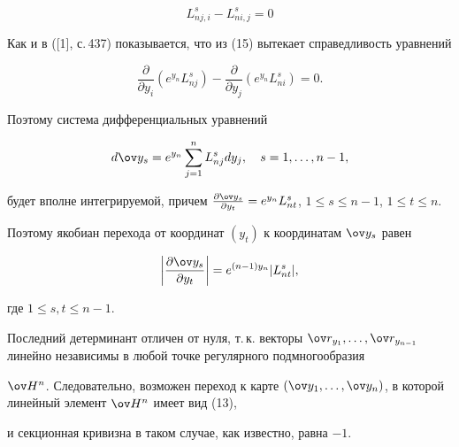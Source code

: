 \begin{note}
\begin{equation}


L^s_{nj,i}-L^s_{ni,j}=0


\end{equation}





Как и в ([1], с.\,437) показывается, что из (15) вытекает справедливость уравнений 


$$


\frac{\partial }{\partial y_i} (e^{y_n}L^s_{nj})


- \frac{\partial }{\partial y_j}( e^{y_n}L^s_{ni}) =0.


$$


Поэтому система дифференциальных уравнений 


$$


d \ov y_s=e^{y_n} \sum_{j=1}^nL^s_{nj }dy_j,\quad s=1,\dotsc,n-1,


$$


будет вполне интегрируемой, причем $\frac{\partial \ov y_s}{\partial y_t}


=e^{y_n}L^s_{nt}$, $1 \leq s \leq n-1$, $1\leq t \leq n$.


Поэтому якобиан перехода от координат $(y_t)$ к координатам $\ov y_s$ равен 


$$


\bigg| \frac{\partial \ov y_s}{\partial y_t} \bigg|=


e^{(n-1)y_n} |L^s_{nt}|,


$$


где $1 \leq s,t \leq n-1$.





Последний детерминант отличен от нуля, т.\,к. векторы $\ov r_{y_1},\dotsc, 


\ov r_{y_{n-1}}$ линейно независимы в любой точке регулярного подмногообразия 


$\ov H{}^n$. Следовательно, возможен переход к карте $(\ov y_1,\dotsc,


\ov y_n)$, в которой линейный элемент $\ov H{}^n$ имеет вид (13), 


и секционная кривизна в таком случае, как известно, равна $-1$.


\end{note}





